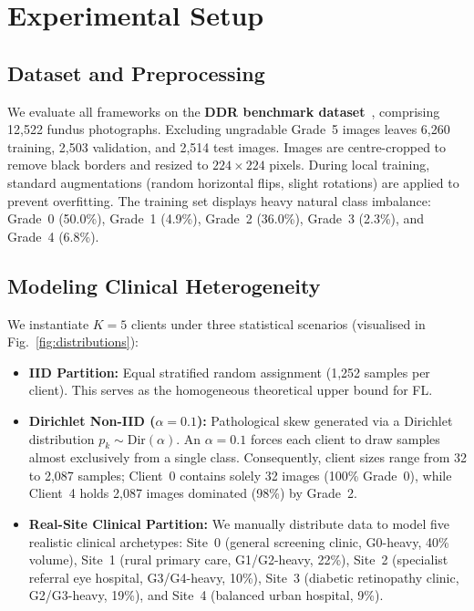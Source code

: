 \section{Experimental Setup}
\label{sec:experiments}

\subsection{Dataset and Preprocessing}

We evaluate all frameworks on the \textbf{DDR benchmark dataset}~\cite{li2019ddr},
comprising 12,522 fundus photographs. Excluding ungradable Grade~5 images leaves
6,260 training, 2,503 validation, and 2,514 test images. Images are centre-cropped
to remove black borders and resized to $224 \times 224$ pixels. During local training,
standard augmentations (random horizontal flips, slight rotations) are applied to
prevent overfitting. The training set displays heavy natural class imbalance:
Grade~0 (50.0\%), Grade~1 (4.9\%), Grade~2 (36.0\%), Grade~3 (2.3\%), and Grade~4 (6.8\%).

\subsection{Modeling Clinical Heterogeneity}

We instantiate $K = 5$ clients under three statistical scenarios (visualised in
Fig.~\ref{fig:distributions}):
\begin{itemize}[leftmargin=*,noitemsep,topsep=2pt]
  \item \textbf{IID Partition:} Equal stratified random assignment (1,252 samples
  per client). This serves as the homogeneous theoretical upper bound for FL.
  \item \textbf{Dirichlet Non-IID ($\alpha=0.1$):} Pathological skew generated
  via a Dirichlet distribution $p_k \sim \mathrm{Dir}(\alpha)$. An $\alpha=0.1$
  forces each client to draw samples almost exclusively from a single class.
  Consequently, client sizes range from 32 to 2,087 samples; Client~0 contains
  solely 32 images (100\% Grade~0), while Client~4 holds 2,087 images dominated
  (98\%) by Grade~2.
  \item \textbf{Real-Site Clinical Partition:} We manually distribute data to model
  five realistic clinical archetypes: Site~0 (general screening clinic, G0-heavy,
  40\% volume), Site~1 (rural primary care, G1/G2-heavy, 22\%), Site~2 (specialist
  referral eye hospital, G3/G4-heavy, 10\%), Site~3 (diabetic retinopathy clinic,
  G2/G3-heavy, 19\%), and Site~4 (balanced urban hospital, 9\%).
\end{itemize}

